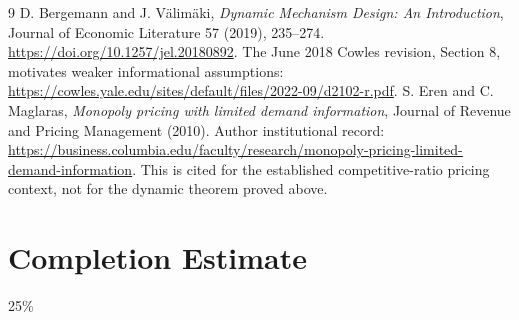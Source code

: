 \documentclass[11pt]{article}
\theoremstyle{remark}\newtheorem{remark}[theorem]{Remark}
\begin{document}
\begin{thebibliography}{9}
 D. Bergemann and J. V\"alim\"aki, \emph{Dynamic Mechanism Design: An Introduction}, Journal of Economic Literature 57 (2019), 235--274. \url{https://doi.org/10.1257/jel.20180892}. The June 2018 Cowles revision, Section 8, motivates weaker informational assumptions: \url{https://cowles.yale.edu/sites/default/files/2022-09/d2102-r.pdf}.
 S. Eren and C. Maglaras, \emph{Monopoly pricing with limited demand information}, Journal of Revenue and Pricing Management (2010). Author institutional record: \url{https://business.columbia.edu/faculty/research/monopoly-pricing-limited-demand-information}. This is cited for the established competitive-ratio pricing context, not for the dynamic theorem proved above.
\end{thebibliography}

\section{Completion Estimate}
25\%
\end{document}

